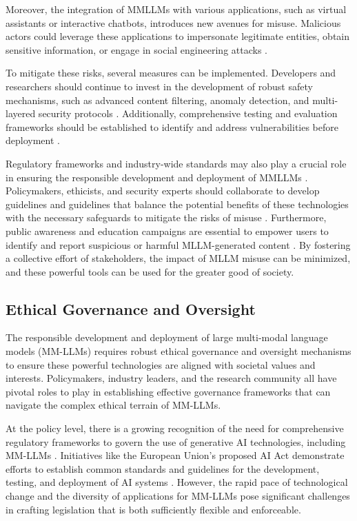 \documentclass[11pt]{article}
\begin{document}
Moreover, the integration of MMLLMs with various applications, such as virtual assistants or interactive chatbots, introduces new avenues for misuse. Malicious actors could leverage these applications to impersonate legitimate entities, obtain sensitive information, or engage in social engineering attacks \cite{ref270,ref79}.

To mitigate these risks, several measures can be implemented. Developers and researchers should continue to invest in the development of robust safety mechanisms, such as advanced content filtering, anomaly detection, and multi-layered security protocols \cite{ref271,ref86}. Additionally, comprehensive testing and evaluation frameworks should be established to identify and address vulnerabilities before deployment \cite{ref272,ref273}.

Regulatory frameworks and industry-wide standards may also play a crucial role in ensuring the responsible development and deployment of MMLLMs \cite{ref274}. Policymakers, ethicists, and security experts should collaborate to develop guidelines and guidelines that balance the potential benefits of these technologies with the necessary safeguards to mitigate the risks of misuse \cite{ref275}. Furthermore, public awareness and education campaigns are essential to empower users to identify and report suspicious or harmful MLLM-generated content \cite{ref276}. By fostering a collective effort of stakeholders, the impact of MLLM misuse can be minimized, and these powerful tools can be used for the greater good of society.

\subsection{Ethical Governance and Oversight}

The responsible development and deployment of large multi-modal language models (MM-LLMs) requires robust ethical governance and oversight mechanisms to ensure these powerful technologies are aligned with societal values and interests. Policymakers, industry leaders, and the research community all have pivotal roles to play in establishing effective governance frameworks that can navigate the complex ethical terrain of MM-LLMs.

At the policy level, there is a growing recognition of the need for comprehensive regulatory frameworks to govern the use of generative AI technologies, including MM-LLMs \cite{ref277,ref278}. Initiatives like the European Union's proposed AI Act demonstrate efforts to establish common standards and guidelines for the development, testing, and deployment of AI systems \cite{ref278}. However, the rapid pace of technological change and the diversity of applications for MM-LLMs pose significant challenges in crafting legislation that is both sufficiently flexible and enforceable.
\end{document}
